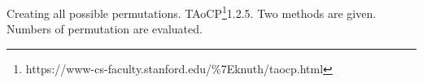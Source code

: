 
\def\a{\left(\matrix}
\def\b{\cr}
\def\c{\right)}

\def\d{\footnote*{http://web.mit.edu/sp.268/www/rubik.pdf}}
\def\f{\footnote*{https://www-cs-faculty.stanford.edu/\%7Eknuth/taocp.html}}
\def\e{\bigskip}

\e
Creating all possible permutations.  TAoCP\f 1.2.5.
Two methods are given.  Numbers of permutation are evaluated.

\bye
